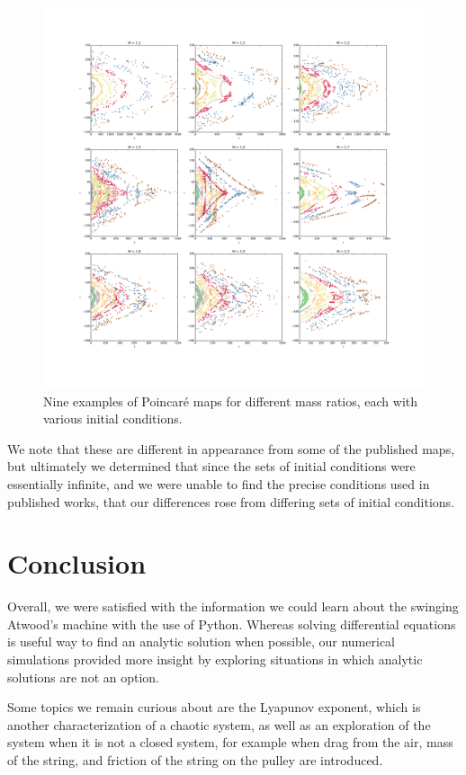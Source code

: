 \documentclass{article}
\begin{document}
\begin{figure}
\centering
\includegraphics[width=\textwidth]{nine_plots}
\caption{Nine examples of Poincar\'e maps for different mass ratios, each with various initial conditions.}
\label{nine_plots}
\end{figure}

We note that these are different in appearance from some of the published maps, but ultimately we determined that since the sets of initial conditions were essentially infinite, and we were unable to find the precise conditions used in published works, that our differences rose from differing sets of initial conditions.

\section*{Conclusion}

Overall, we were satisfied with the information we could learn about the swinging Atwood's machine with the use of Python.  Whereas solving differential equations is useful way to find an analytic solution when possible, our numerical simulations provided more insight by exploring situations in which analytic solutions are not an option.  

Some topics we remain curious about are the Lyapunov exponent, which is another characterization of a chaotic system, as well as an exploration of the system when it is not a closed system, for example when drag from the air, mass of the string, and friction of the string on the pulley are introduced.
\end{document}
